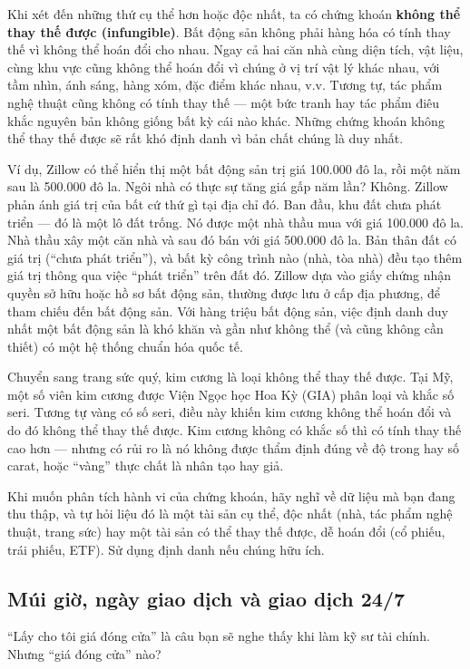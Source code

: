 Khi xét đến những thứ cụ thể hơn hoặc độc nhất, ta có chứng khoán \textbf{không thể thay thế được (infungible)}. Bất động sản không phải hàng hóa có tính thay thế vì không thể hoán đổi cho nhau. Ngay cả hai căn nhà cùng diện tích, vật liệu, cùng khu vực cũng không thể hoán đổi vì chúng ở vị trí vật lý khác nhau, với tầm nhìn, ánh sáng, hàng xóm, đặc điểm khác nhau, v.v. Tương tự, tác phẩm nghệ thuật cũng không có tính thay thế — một bức tranh hay tác phẩm điêu khắc nguyên bản không giống bất kỳ cái nào khác. Những chứng khoán không thể thay thế được sẽ rất khó định danh vì bản chất chúng là duy nhất.

Ví dụ, Zillow có thể hiển thị một bất động sản trị giá 100.000 đô la, rồi một năm sau là 500.000 đô la. Ngôi nhà có thực sự tăng giá gấp năm lần? Không. Zillow phản ánh giá trị của bất cứ thứ gì tại địa chỉ đó. Ban đầu, khu đất chưa phát triển — đó là một lô đất trống. Nó được một nhà thầu mua với giá 100.000 đô la. Nhà thầu xây một căn nhà và sau đó bán với giá 500.000 đô la. Bản thân đất có giá trị (``chưa phát triển''), và bất kỳ công trình nào (nhà, tòa nhà) đều tạo thêm giá trị thông qua việc ``phát triển'' trên đất đó. Zillow dựa vào giấy chứng nhận quyền sở hữu hoặc hồ sơ bất động sản, thường được lưu ở cấp địa phương, để tham chiếu đến bất động sản. Với hàng triệu bất động sản, việc định danh duy nhất một bất động sản là khó khăn và gần như không thể (và cũng không cần thiết) có một hệ thống chuẩn hóa quốc tế.

Chuyển sang trang sức quý, kim cương là loại không thể thay thế được. Tại Mỹ, một số viên kim cương được Viện Ngọc học Hoa Kỳ (GIA) phân loại và khắc số seri. Tương tự vàng có số seri, điều này khiến kim cương không thể hoán đổi và do đó không thể thay thế được. Kim cương không có khắc số thì có tính thay thế cao hơn — nhưng có rủi ro là nó không được thẩm định đúng về độ trong hay số carat, hoặc ``vàng'' thực chất là nhân tạo hay giả.

Khi muốn phân tích hành vi của chứng khoán, hãy nghĩ về dữ liệu mà bạn đang thu thập, và tự hỏi liệu đó là một tài sản cụ thể, độc nhất (nhà, tác phẩm nghệ thuật, trang sức) hay một tài sản có thể thay thế được, dễ hoán đổi (cổ phiếu, trái phiếu, ETF). Sử dụng định danh nếu chúng hữu ích.

\subsection{Múi giờ, ngày giao dịch và giao dịch 24/7}

``Lấy cho tôi giá đóng cửa'' là câu bạn sẽ nghe thấy khi làm kỹ sư tài chính. Nhưng ``giá đóng cửa'' nào?

